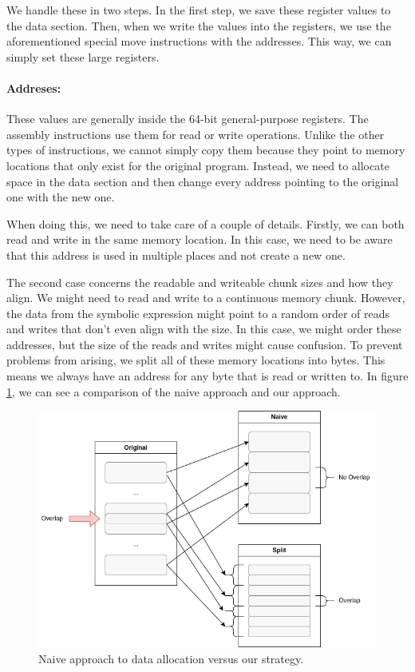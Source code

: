 We handle these in two steps.
In the first step, we save these register values to the data section.
Then, when we write the values into the registers, we use the aforementioned special move instructions with the addresses.
This way, we can simply set these large registers.

\paragraph{Addreses:}
These values are generally inside the 64-bit general-purpose registers.
The assembly instructions use them for read or write operations.
Unlike the other types of instructions, we cannot simply copy them because they point to memory locations that only exist for the original program.
Instead, we need to allocate space in the data section and then change every address pointing to the original one with the new one.

When doing this, we need to take care of a couple of details.
Firstly, we can both read and write in the same memory location.
In this case, we need to be aware that this address is used in multiple places and not create a new one.

The second case concerns the readable and writeable chunk sizes and how they align.
We might need to read and write to a continuous memory chunk.
However, the data from the symbolic expression might point to a random order of reads and writes that don't even align with the size.
In this case, we might order these addresses, but the size of the reads and writes might cause confusion.
To prevent problems from arising, we split all of these memory locations into bytes.
This means we always have an address for any byte that is read or written to.
In figure \ref{fig:addr_match}, we can see a comparison of the naive approach and our approach.

\begin{figure}[ht]
    \centering
    \includegraphics[width=0.8\linewidth]{figures/alloc2}
    \caption{Naive approach to data allocation versus our strategy.}
    \label{fig:addr_match}
\end{figure}


